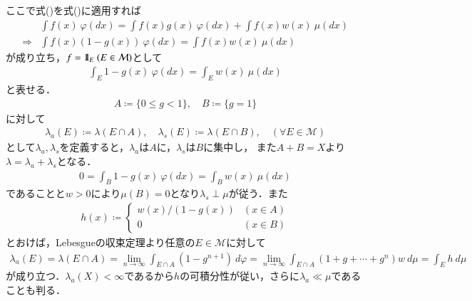 \begin{prf}
\begin{description}
		ここで式()を式()に適用すれば
		\begin{align}
			&\int f(x)\ \varphi(dx) = \int f(x)g(x)\ \varphi(dx) + \int f(x)w(x)\ \mu(dx) \\
			\Rightarrow &\int f(x)(1-g(x))\ \varphi(dx) = \int f(x)w(x)\ \mu(dx)
		\end{align}
		が成り立ち，$f = \mbox{1}\hspace{-0.25em}\mbox{l}_E\ (E \in \mathcal{M})$として
		\begin{align}
			\int_E 1-g(x)\ \varphi(dx) = \int_E w(x)\ \mu(dx)
		\end{align}
		と表せる．
		\begin{align}
			A \coloneqq \{0 \leq g < 1\}, \quad B \coloneqq \{g = 1\}
		\end{align}
		に対して
		\begin{align}
			\lambda_a(E) \coloneqq \lambda(E \cap A), \quad \lambda_s(E) \coloneqq \lambda(E \cap B), \quad (\forall E \in \mathcal{M})
		\end{align}
		として$\lambda_a,\lambda_s$を定義すると，$\lambda_a$は$A$に，$\lambda_s$は$B$に集中し，
		また$A+B=X$より$\lambda = \lambda_a + \lambda_s$となる．
		\begin{align}
			0 = \int_B 1-g(x)\ \varphi(dx) = \int_B w(x)\ \mu(dx)
		\end{align}
		であることと$w > 0$により$\mu(B) = 0$となり$\lambda_s \perp \mu$が従う．また
		\begin{align}
			h(x) \coloneqq
			\begin{cases}
				w(x)/(1-g(x)) & (x \in A) \\
				0 & (x \in B)
			\end{cases}
		\end{align}
		とおけば，Lebesgueの収束定理より任意の$E \in \mathcal{M}$に対して
		\begin{align}
			\lambda_a(E) = \lambda(E \cap A) = \lim_{n \to \infty} \int_{E \cap A} (1 - g^{n+1})\ d\varphi 
			= \lim_{n \to \infty} \int_{E \cap A} (1 + g + \cdots + g^n)w\ d\mu = \int_E h\ d\mu 
		\end{align}
		が成り立つ．$\lambda_a(X) < \infty$であるから$h$の可積分性が従い，さらに$\lambda_a \ll \mu$であることも判る．
	\end{description}
	\QED
	\end{prf}